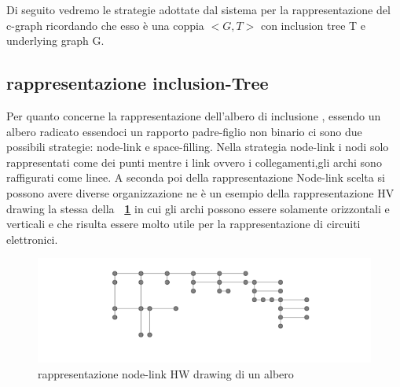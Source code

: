 {Di seguito vedremo le strategie adottate dal sistema per la rappresentazione del c-graph ricordando che esso è una coppia $<G,T>$ con inclusion tree T e underlying graph G. 

\subsection{rappresentazione inclusion-Tree}
Per quanto concerne la rappresentazione dell'albero di inclusione , essendo un albero radicato essendoci un rapporto padre-figlio non binario ci sono due possibili strategie: node-link e space-filling.
Nella strategia node-link i nodi solo rappresentati come dei punti mentre i link ovvero i collegamenti,gli archi sono raffigurati come linee. A seconda poi della rappresentazione Node-link scelta si possono avere diverse organizzazione ne è un esempio della rappresentazione HV drawing la stessa della \textbf{\figurename~\ref{fig:nodeLink}} in cui gli archi possono essere solamente orizzontali e verticali e che risulta essere molto utile per la rappresentazione di circuiti elettronici.
\begin{figure}[!htb]
	\begin{center}
		\includegraphics[width=0.8 \linewidth]{figure/nodeLink}
	\end{center}
	\caption{rappresentazione node-link HW drawing di un albero \label{fig:nodeLink}}
\end{figure}

}
